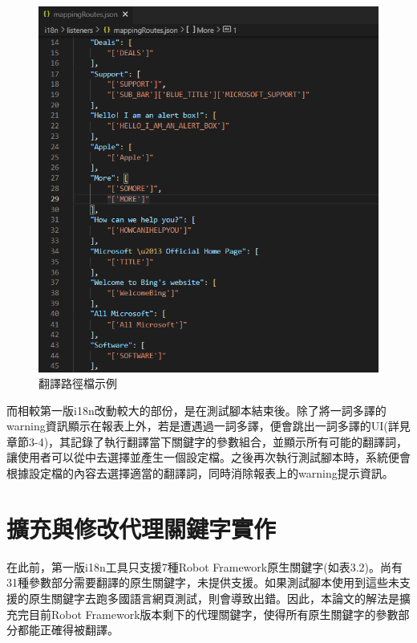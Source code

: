 \begin{figure}[H]
\includegraphics[width= \textwidth]{../論文截圖/3-1-3-3 翻譯路徑檔.png}
\caption{翻譯路徑檔示例}
\end{figure}

而相較第一版i18n改動較大的部份，是在測試腳本結束後。除了將一詞多譯的warning資訊顯示在報表上外，若是遭遇過一詞多譯，便會跳出一詞多譯的UI(詳見章節3-4)，其記錄了執行翻譯當下關鍵字的參數組合，並顯示所有可能的翻譯詞，讓使用者可以從中去選擇並產生一個設定檔。之後再次執行測試腳本時，系統便會根據設定檔的內容去選擇適當的翻譯詞，同時消除報表上的warning提示資訊。

\section{擴充與修改代理關鍵字實作}
在此前，第一版i18n工具只支援7種Robot Framework原生關鍵字(如表3.2)。尚有31種參數部分需要翻譯的原生關鍵字，未提供支援。如果測試腳本使用到這些未支援的原生關鍵字去跑多國語言網頁測試，則會導致出錯。因此，本論文的解法是擴充完目前Robot Framework版本剩下的代理關鍵字，使得所有原生關鍵字的參數部分都能正確得被翻譯。

